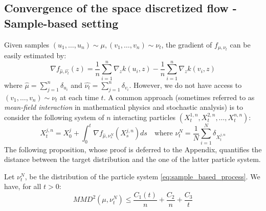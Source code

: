 \subsection{Convergence of the space discretized flow - Sample-based setting}

Given samples $(u_1, \dots, u_n)\sim \mu, (v_1, \dots, v_n)\sim \nu_t$, the gradient of $f_{\mu, \nu_t}$ can be easily estimated by:
\begin{equation}
\nabla f_{\widehat{\mu},\widehat{\nu_t}}(z)= \frac{1}{n}\sum_{i=1}^{n}\nabla_{z}k(u_i,z) -\frac{1}{n}\sum_{i=1}^{n}\nabla_{z}k(v_i,z) 
\end{equation}
where $\widehat{ \mu}=\sum_{j=1}^{n}\delta_{u_i}$ and $\widehat{ \nu_t}=\sum_{j=1}^{n}\delta_{v_i}$. However, we do not have access to $(v_1, \dots, v_n)\sim \nu_t$ at each time $t$. A common approach (sometimes referred to as \textit{mean-field interaction} in mathematical physics and stochastic analysis) is to consider the following system of $n$ interacting particles $(X_t^{1,n}, X_t^{2,n}, \dots, X_t^{n,n})$: \begin{equation}\label{eq:sample_based_process}
X_t^{j,n}=X_{0}^j+\int_{0}^t \nabla f_{\widehat{\mu}, \nu_s^N}(X_s^{j,n})ds \quad \text{where } \nu_t^N=\frac{1}{N} \sum_{i=1}^N \delta_{X_t^{j,n}}
\end{equation}
The following proposition, whose proof is deferred to the Appendix, quantifies the distance between the target distribution and the one of the latter particle system.
\begin{proposition}\label{prop:sample_based_rates}
	 Let $\nu_t^N$, be the distribution of the particle system \eqref{eq:sample_based_process}. We have, for all $t>0$:
	\begin{equation}
	MMD^2(\mu,\nu_t^N)\le \frac{C_1(t)}{n}+ \frac{C_2}{n} + \frac{C_3}{t}
	\end{equation}
\end{proposition}
